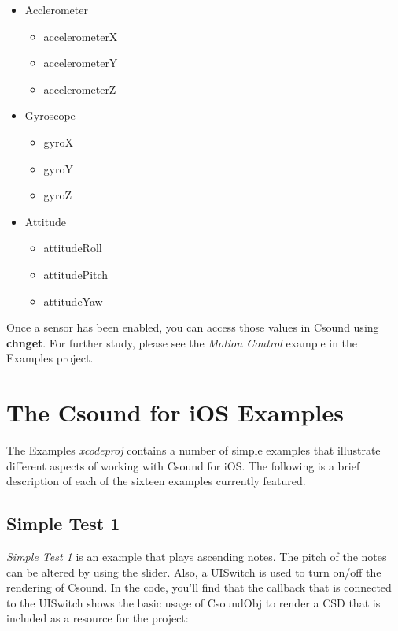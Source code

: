 \documentclass[11pt]{article}
\begin{document}
\begin{itemize}

\item Acclerometer
\begin{itemize}
\item accelerometerX
\item accelerometerY
\item accelerometerZ
\end{itemize}

\item Gyroscope
\begin{itemize}
\item gyroX
\item gyroY
\item gyroZ
\end{itemize}

\item Attitude
\begin{itemize}
\item attitudeRoll
\item attitudePitch
\item attitudeYaw
\end{itemize}

\end{itemize}

Once a sensor has been enabled, you can access those values in Csound using \textbf{chnget}. For further study, please see the \emph{Motion Control} example in the Examples project.


\section{The Csound for iOS Examples}

The Examples \textit{xcodeproj} contains a number of simple examples that illustrate different aspects of working with Csound for iOS.  The following is a brief description of each of the sixteen examples currently featured.

\subsection{Simple Test 1}

\emph{Simple Test 1} is an example that plays ascending notes.  The pitch of the notes can be altered by using the slider.  Also, a UISwitch is used to turn on/off the rendering of Csound.  In the code, you'll find that the callback that is connected to the UISwitch shows the basic usage of CsoundObj to render a CSD that is included as a resource for the project:
\end{document}

